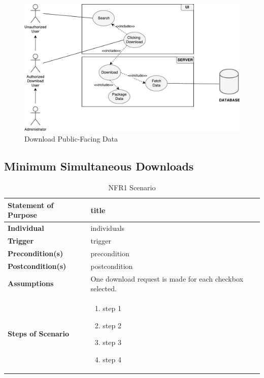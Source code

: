 \documentclass{article}
\begin{document}
\begin{figure}[H]
	\begin{center}
		\caption{Download Public-Facing Data}
		\label{FR1-use-case}
		\includegraphics[width=\textwidth]{images/download-use-case.pdf}
	\end{center}
\end{figure}

\subsection{Minimum Simultaneous Downloads}

\begin{table}[H]
	\caption{NFR1 Scenario}
	\begin{tabularx}{\textwidth}{|l|X|}
		\hline
		\textbf{Statement of Purpose} & title         \\ \hline
		\textbf{Individual}      & individuals \\ \hline
		\textbf{Trigger}  & trigger            \\ \hline
		\textbf{Precondition(s)}  & precondition \\ \hline
		\textbf{Postcondition(s)}  & postcondition \\ \hline
		\textbf{Assumptions} & One download request is made for each 
			checkbox selected. \\ \hline
		\textbf{Steps of Scenario} & 
		\begin{enumerate}
				\item step 1 
				\item step 2 
				\item step 3 
				\item step 4 
			\end{enumerate}  \\  \hline
	\end{tabularx}
\end{table}
\end{document}
